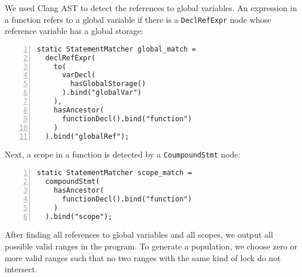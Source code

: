 We used Clang AST to detect the references to global variables. An expression in a function refers to a global variable if there is a \verb|DeclRefExpr| node whose reference variable has a global storage:

\begin{lstlisting}[frame=tb, xleftmargin=2em, framexleftmargin=1.5em, numbers=left]
static StatementMatcher global_match =
  declRefExpr(
    to(
      varDecl(
        hasGlobalStorage()
      ).bind("globalVar")
    ),
    hasAncestor(
      functionDecl().bind("function")
    )
  ).bind("globalRef");
  \end{lstlisting}


Next, a scope in a function is detected by a \verb|CoumpoundStmt| node:

\begin{lstlisting}[frame=tb, xleftmargin=2em, framexleftmargin=1.5em, numbers=left]
static StatementMatcher scope_match =
  compoundStmt(
    hasAncestor(
      functionDecl().bind("function")
    )
  ).bind("scope");
  \end{lstlisting}


After finding all references to global variables and all scopes, we output all possible valid ranges in the program. To generate a population, we choose zero or more valid ranges such that no two ranges with the same kind of lock do not intersect.